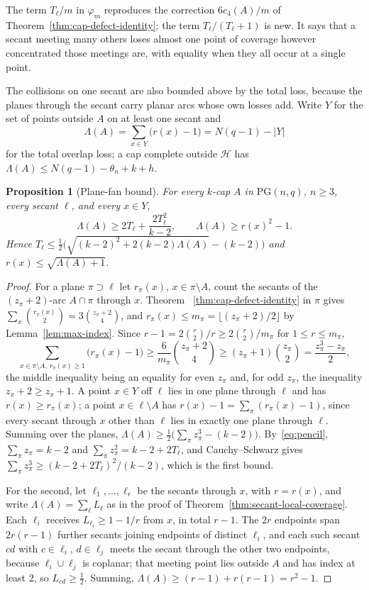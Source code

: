 \documentclass[11pt]{article}
\newtheorem{proposition}[theorem]{Proposition}
\theoremstyle{definition}
\theoremstyle{remark}
\newcommand{\PG}{\mathrm{PG}}
\newcommand{\cH}{\mathcal{H}}
\begin{document}
The term $T_\ell/m$ in $\varphi_m$ reproduces the correction
$6c_4(A)/m$ of Theorem~\ref{thm:cap-defect-identity}; the term
$T_\ell/(T_\ell+1)$ is new.  It says that a secant meeting many others
loses almost one point of coverage however concentrated those meetings
are, with equality when they all occur at a single point.

The collisions on one secant are also bounded above by the total loss,
because the planes through the secant carry planar arcs whose own losses
add.  Write $Y$ for the set of points outside $A$ on at least one secant
and
\[
 \Lambda(A)=\sum_{x\in Y}\bigl(r(x)-1\bigr)=N(q-1)-|Y|
\]
for the total overlap loss; a cap complete outside $\cH$ has
$\Lambda(A)\le N(q-1)-\theta_n+k+h$.

\begin{proposition}[Plane-fan bound]
\label{prop:plane-fan}
For every $k$-cap $A$ in $\PG(n,q)$, $n\ge3$, every secant $\ell$, and
every $x\in Y$,
\[
 \Lambda(A)\ge 2T_\ell+\frac{2T_\ell^2}{k-2},
 \qquad
 \Lambda(A)\ge r(x)^2-1.
\]
Hence
$T_\ell\le\tfrac12\bigl(\sqrt{(k-2)^2+2(k-2)\Lambda(A)}-(k-2)\bigr)$
and $r(x)\le\sqrt{\Lambda(A)+1}$.
\end{proposition}

\begin{proof}
For a plane $\pi\supset\ell$ let $r_\pi(x)$, $x\in\pi\setminus A$, count
the secants of the $(z_\pi+2)$-arc $A\cap\pi$ through $x$.  Theorem~%
\ref{thm:cap-defect-identity} in $\pi$ gives
$\sum_{x}\binom{r_\pi(x)}2=3\binom{z_\pi+2}4$, and
$r_\pi(x)\le m_\pi=\lfloor(z_\pi+2)/2\rfloor$ by
Lemma~\ref{lem:max-index}.  Since $r-1=2\binom r2/r\ge2\binom r2/m_\pi$
for $1\le r\le m_\pi$,
\[
 \sum_{x\in\pi\setminus A,\ r_\pi(x)\ge1}\bigl(r_\pi(x)-1\bigr)
 \ge\frac{6}{m_\pi}\binom{z_\pi+2}4\ge(z_\pi+1)\binom{z_\pi}2
 =\frac{z_\pi^3-z_\pi}2,
\]
the middle inequality being an equality for even $z_\pi$ and, for odd
$z_\pi$, the inequality $z_\pi+2\ge z_\pi+1$.  A point $x\in Y$ off $\ell$
lies in one plane through $\ell$ and has $r(x)\ge r_\pi(x)$; a point
$x\in\ell\setminus A$ has $r(x)-1=\sum_\pi(r_\pi(x)-1)$, since every
secant through $x$ other than $\ell$ lies in exactly one plane through
$\ell$.  Summing over the planes,
$\Lambda(A)\ge\frac12\bigl(\sum_\pi z_\pi^3-(k-2)\bigr)$.  By~\eqref{eq:pencil},
$\sum_\pi z_\pi=k-2$ and $\sum_\pi z_\pi^2=k-2+2T_\ell$, and
Cauchy--Schwarz gives $\sum_\pi z_\pi^3\ge(k-2+2T_\ell)^2/(k-2)$, which
is the first bound.

For the second, let $\ell_1,\dots,\ell_r$ be the secants through $x$, with
$r=r(x)$, and write $\Lambda(A)=\sum_\ell L_\ell$ as in the proof of
Theorem~\ref{thm:secant-local-coverage}.  Each $\ell_i$ receives
$L_{\ell_i}\ge1-1/r$ from $x$, in total $r-1$.  The $2r$ endpoints span
$2r(r-1)$ further secants joining endpoints of distinct $\ell_i$, and each
such secant $cd$ with $c\in\ell_i$, $d\in\ell_j$ meets the secant through
the other two endpoints, because $\ell_i\cup\ell_j$ is coplanar; that
meeting point lies outside $A$ and has index at least $2$, so
$L_{cd}\ge\frac12$.  Summing, $\Lambda(A)\ge(r-1)+r(r-1)=r^2-1$.
\end{proof}
\end{document}
